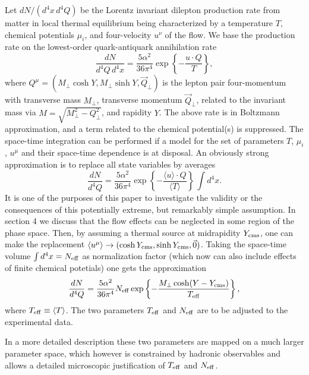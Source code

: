 Let $dN/( d^4 x \, d^4 Q)$ be the Lorentz invariant dilepton production rate
from matter in local thermal equilibrium being characterized by a 
temperature $T$,
chemical potentials $\mu_i$, and
four-velocity $u^\nu$ of the flow.
We base the production
rate \cite{LiGale,RappWambach} on the lowest-order quark-antiquark 
annihilation rate
\begin{equation}
\frac{dN}{d^4 Q \, d^4 x} = \frac{5 \alpha^2}{36 \pi^4}
\exp \left\{ - \frac{u \cdot Q}{T} \right\}, 
\end{equation}
where $Q^\mu = (M_\perp \cosh Y, M_\perp \sinh Y, \vec Q_\perp)$
is the lepton pair four-momentum with  transverse mass $M_\perp$, transverse
momentum $\vec Q_\perp$, related to the invariant mass via
$M =\sqrt{M_\perp^2 - Q_\perp^2}$, and rapidity $Y$.
The above rate is in Boltzmann approximation, and a term related to
the chemical potential(s) is suppressed. 
The space-time integration can be performed if a model 
for the set of parameters
$T$, $\mu_i$, $u^\mu$ and their space-time dependence is at disposal.
An obviously strong approximation is to replace all state variables
by averages
\begin{equation} 
\frac{dN}{d^4 Q} = 
\frac{5 \alpha^2}{36 \pi^4}
\exp \left\{ - 
\frac{\langle u \rangle \cdot Q}{\langle T \rangle } \right\}
\,
\int d^4x.
\end{equation}
It is one of the purposes of this paper to investigate the validity or 
the consequences of this potentially extreme, but remarkably simple
assumption.
In section 4 we discuss that the flow effects can be neglected in some
region of the phase space. Then, by assuming a thermal source at
midrapidity $Y_{\rm cms}$, one can make the replacement
$\langle u^\mu \rangle \to (\cosh Y_{\rm cms}, \sinh Y_{\rm cms}, \vec 0)$. 
Taking the space-time volume $\int d^4 x = N_{\rm eff}$ 
as normalization factor 
(which now can also include effects of finite chemical potetials)
one gets the approximation
\begin{equation}
\frac{dN}{d^4 Q} = 
\frac{5 \alpha^2}{36 \pi^4} N_{\rm eff}
\exp \left\{ - 
\frac{M_\perp \cosh (Y - Y_{\rm cms} )}{T_{\rm eff}} \right\},
\end{equation}
where $T_{\rm eff} \equiv \langle T \rangle$. The two parameters
$T_{\rm eff}$ and $N_{\rm eff}$ are to be adjusted to the experimental data.

In a more detailed description 
these two parameters are mapped on a much larger parameter space,
which however is constrained by hadronic observables and allows
a detailed microscopic justification of $T_{\rm eff}$ and $N_{\rm eff}$. 

